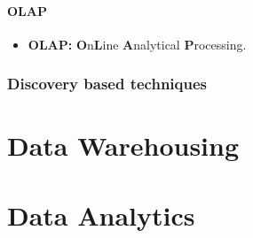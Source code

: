 \documentclass[a4paper,twoside,10pt]{report}
\begin{document}
\paragraph{OLAP}
\begin{itemize}
	\item \textbf{OLAP:} \textbf{O}n\textbf{L}ine \textbf{A}nalytical \textbf{P}rocessing.
\end{itemize}
\subsubsection{Discovery based techniques}


\section{Data Warehousing}


\section{Data Analytics}
\end{document}
